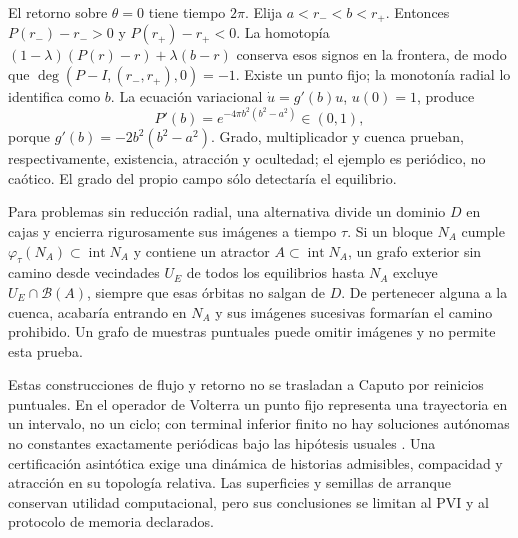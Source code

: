 El retorno sobre $\theta=0$ tiene tiempo $2\pi$. Elija
$a<r_-<b<r_+$. Entonces $P(r_-)-r_->0$ y $P(r_+)-r_+<0$.
La homotopía $(1-\lambda)(P(r)-r)+\lambda(b-r)$ conserva esos signos
en la frontera, de modo que $\deg(P-I,(r_-,r_+),0)=-1$.
Existe un punto fijo; la monotonía radial lo identifica como $b$.
La ecuación variacional $\dot u=g'(b)u$, $u(0)=1$, produce
\begin{equation}
 P'(b)=e^{-4\pi b^2(b^2-a^2)}\in(0,1),
 \label{bre:geo:multiplier}
\end{equation}
porque $g'(b)=-2b^2(b^2-a^2)$. Grado, multiplicador y cuenca prueban,
respectivamente, existencia, atracción y ocultedad; el ejemplo es periódico,
no caótico. El grado del propio campo sólo detectaría el equilibrio.

Para problemas sin reducción radial, una alternativa divide un dominio
$D$ en cajas y encierra rigurosamente sus imágenes a tiempo $\tau$.
Si un bloque $N_A$ cumple
$\varphi_\tau(N_A)\subset\operatorname{int}N_A$ y contiene un atractor
$A\subset\operatorname{int}N_A$, un grafo exterior sin camino desde
vecindades $U_E$ de todos los equilibrios hasta $N_A$ excluye
$U_E\cap\mathcal B(A)$, siempre que esas órbitas no salgan de $D$.
De pertenecer alguna a la cuenca, acabaría entrando en $N_A$ y sus
imágenes sucesivas formarían el camino prohibido. Un grafo de muestras
puntuales puede omitir imágenes y no permite esta prueba.

Estas construcciones de flujo y retorno no se trasladan a Caputo por
reinicios puntuales. En el operador de Volterra un punto fijo representa
una trayectoria en un intervalo, no un ciclo; con terminal inferior
finito no hay soluciones autónomas no constantes exactamente periódicas
bajo las hipótesis usuales \cite{TavazoeiHaeri2009,KaslikSivasundaram2012}.
Una certificación asintótica exige una dinámica de historias admisibles,
compacidad y atracción en su topología relativa. Las superficies y
semillas de arranque conservan utilidad computacional, pero sus
conclusiones se limitan al PVI y al protocolo de memoria declarados.
